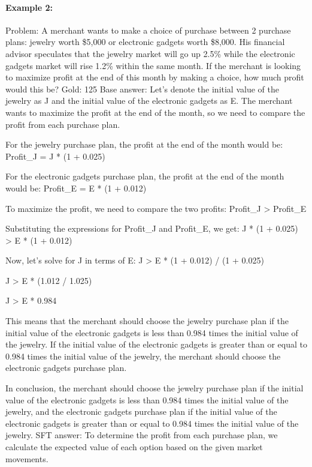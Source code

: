 \documentclass[11pt]{article}
\begin{document}
\paragraph{Example 2:}
\begin{answerbox}
Problem: A merchant wants to make a choice of purchase between 2 purchase plans: jewelry worth \$5,000 or electronic gadgets worth \$8,000. His financial advisor speculates that the jewelry market will go up 2.5\% while the electronic gadgets market will rise 1.2\% within the same month. If the merchant is looking to maximize profit at the end of this month by making a choice, how much profit would this be?
Gold: 125
Base answer:
Let's denote the initial value of the jewelry as J and the initial value of the electronic gadgets as E. The merchant wants to maximize the profit at the end of the month, so we need to compare the profit from each purchase plan.

For the jewelry purchase plan, the profit at the end of the month would be:
Profit_J = J * (1 + 0.025)

For the electronic gadgets purchase plan, the profit at the end of the month would be:
Profit_E = E * (1 + 0.012)

To maximize the profit, we need to compare the two profits:
Profit_J > Profit_E

Substituting the expressions for Profit_J and Profit_E, we get:
J * (1 + 0.025) > E * (1 + 0.012)

Now, let's solve for J in terms of E:
J > E * (1 + 0.012) / (1 + 0.025)

J > E * (1.012 / 1.025)

J > E * 0.984

This means that the merchant should choose the jewelry purchase plan if the initial value of the electronic gadgets is less than 0.984 times the initial value of the jewelry. If the initial value of the electronic gadgets is greater than or equal to 0.984 times the initial value of the jewelry, the merchant should choose the electronic gadgets purchase plan.

In conclusion, the merchant should choose the jewelry purchase plan if the initial value of the electronic gadgets is less than 0.984 times the initial value of the jewelry, and the electronic gadgets purchase plan if the initial value of the electronic gadgets is greater than or equal to 0.984 times the initial value of the jewelry.
SFT answer:
To determine the profit from each purchase plan, we calculate the expected value of each option based on the given market movements.


\end{answerbox}
\end{document}
